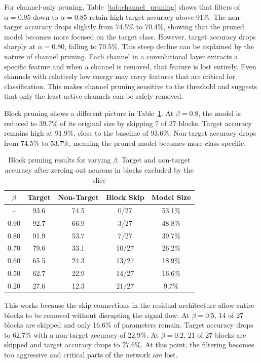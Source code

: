\documentclass[
12pt,
fancyheadings,
a4paper,
twoside,
BCOR=0.7cm,
nobcorignoretitle,
grayscalebody,
]{stsreprt}
\begin{document}
For channel-only pruning, Table~\ref{tab:channel_pruning} shows that filters of $\alpha = 0.95$
down to $\alpha = 0.85$ retain high target accuracy above 91\%.
The non-target accuracy drops slightly from 74.5\% to 70.4\%, showing that the pruned model becomes
more focused on the target class.
However, target accuracy drops sharply at $\alpha = 0.80$, falling to 70.5\%.
This steep decline can be explained by the nature of channel pruning.
Each channel in a convolutional layer extracts a specific feature and when a channel is removed,
that feature is lost entirely.
Even channels with relatively low energy may carry features that are critical for classification.
This makes channel pruning sensitive to the threshold and suggests that only the least active
channels can be safely removed.

Block pruning shows a different picture in Table~\ref{tab:block_pruning}.
At $\beta = 0.8$, the model is reduced to 39.7\% of its original size by skipping 7 of 27 blocks.
Target accuracy remains high at 91.9\%, close to the baseline of 93.6\%.
Non-target accuracy drops from 74.5\% to 53.7\%, meaning the pruned model becomes more
class-specific.
\begin{table}[ht]
\centering
\caption{Block pruning results for varying $\beta$. Target and non-target accuracy after zeroing out neurons in blocks excluded by the slice}
\label{tab:block_pruning}
\begin{tabular}{ccccc}
\toprule
\textbf{$\beta$} & \textbf{Target} & \textbf{Non-Target} & \textbf{Block Skip} & \textbf{Model Size} \\
\midrule
-- & 93.6 & 74.5 & 0/27 & 53.1\% \\
\midrule
0.90 & 92.7 & 66.9 & 3/27 & 48.8\% \\
0.80 & 91.9 & 53.7 & 7/27 & 39.7\% \\
0.70 & 79.6 & 33.1 & 10/27 & 26.2\% \\
0.60 & 65.5 & 24.3 & 13/27 & 18.9\% \\
0.50 & 62.7 & 22.9 & 14/27 & 16.6\% \\
0.20 & 27.6 & 12.3 & 21/27 & 9.7\% \\
\bottomrule
\end{tabular}
\end{table}

This works because the skip connections in the residual architecture allow entire blocks to be
removed without disrupting the signal flow.
At $\beta = 0.5$, 14 of 27 blocks are skipped and only 16.6\% of parameters remain.
Target accuracy drops to 62.7\% with a non-target accuracy of 22.9\%.
At $\beta = 0.2$, 21 of 27 blocks are skipped and target accuracy drops to 27.6\%.
At this point, the filtering becomes too aggressive and critical parts of the network are lost.
\end{document}
